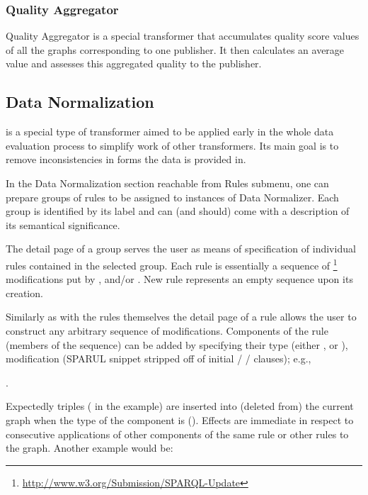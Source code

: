 \subsubsection*{Quality Aggregator}

Quality Aggregator is a special transformer that accumulates quality score values of all the graphs corresponding to one publisher. It then calculates an average value and assesses this aggregated quality to the publisher.

\subsection{Data Normalization}
\label{sub:dataNormalization}

 is a special type of {transformer} aimed to be applied early in the whole data evaluation process to simplify work of other {transformers}. Its main goal is to remove inconsistencies in forms the data is provided in.

In the Data Normalization section reachable from Rules submenu, one can prepare groups of rules to be assigned to instances of {Data Normalizer}. Each group is identified by its label and can (and should) come with a description of its semantical significance.

The detail page of a group serves the user as means of specification of individual rules contained in the selected group. Each rule is essentially a sequence of \footnote{\url{http://www.w3.org/Submission/SPARQL-Update}} modifications put by ,  and/or . New rule represents an empty sequence upon its creation.

Similarly as with the rules themselves the detail page of a rule allows the user to construct any arbitrary sequence of modifications. Components of the rule (members of the sequence) can be added by specifying their type (either ,  or ), modification ({SPARUL} snippet stripped off of initial  /  /  clauses); e.g.,

\begin{center}
	.
\end{center}

Expectedly triples ( in the example) are inserted into (deleted from) the current graph when the type of the component is  (). Effects are immediate in respect to consecutive applications of other components of the same rule or other rules to the graph. Another example would be:

